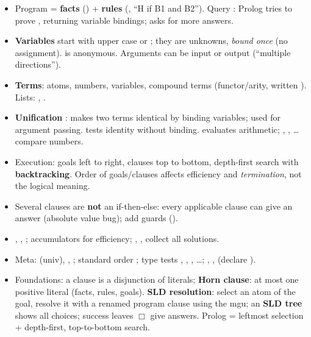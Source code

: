 \begin{nbsummary}[Prolog]
\small
\begin{itemize}[nosep]
  \item Program = \textbf{facts} () + \textbf{rules}
        (, ``H if B1 and B2''). Query : Prolog tries to prove
        , returning variable bindings; \code{;} asks for more answers.
  \item \textbf{Variables} start with upper case or \code{\_}; they are unknowns,
        \emph{bound once} (no assignment). \code{\_} is anonymous. Arguments can be input or
        output (``multiple directions'').
  \item \textbf{Terms}: atoms, numbers, variables, compound terms 
        (functor/arity, written ). Lists: \code{[]}, \code{[H|T]}.
  \item \textbf{Unification} \code{=}: makes two terms identical by binding variables;
        used for argument passing. \code{==} tests identity without binding.
         evaluates arithmetic; \code{=:=}, \code{<}, \code{>=}\ldots{} compare numbers.
  \item Execution: goals left to right, clauses top to bottom, depth-first search with
        \textbf{backtracking}. Order of goals/clauses affects efficiency and
        \emph{termination}, not the logical meaning.
  \item Several clauses are \textbf{not} an if-then-else: every applicable clause can give
        an answer (absolute value bug); add guards ().
  \item {}, , ; accumulators for efficiency;
        , ,  collect all solutions.
  \item Meta:  (univ), , ; standard order
        ; type tests , , , \ldots;
        , ,  (declare ).
  \item Foundations: a clause is a disjunction of literals; \textbf{Horn clause}: at most
        one positive literal (facts, rules, goals). \textbf{SLD resolution}: select an atom
        of the goal, resolve it with a renamed program clause using the mgu; an
        \textbf{SLD tree} shows all choices; success leaves $\Box$ give answers. Prolog =
        leftmost selection + depth-first, top-to-bottom search.
\end{itemize}
\end{nbsummary}

